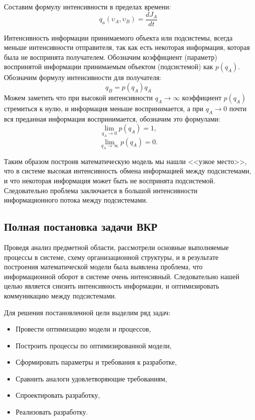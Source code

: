 Составим формулу интенсивности в пределах времени:
\begin{equation}\label{eq:intensiveA}
q_a(\upsilon_A,\upsilon_B) = \frac{dJ_A}{dt}
\end{equation}

Интенсивность информации принимаемого объекта или подсистемы, всегда меньше интенсивности отправителя, так как есть некоторая информация, которая была не воспринята получателем. Обозначим коэффициент (параметр) воспринятой информации принимаемым объектом (подсистемой) как $p(q_A)$. Обозначим формулу интенсивности для получателя:
\begin{equation}\label{eq:intensiveB}
q_B = p(q_A)q_A
\end{equation}
Можем заметить что при высокой интенсивности $q_A \rightarrow \infty$ коэффициент $p(q_A)$ стремиться к нулю, и информация меньше воспринимается, а при $q_A \rightarrow 0$ почти вся преданная информация воспринимается, обозначим это формулами:
\begin{equation}\label{eq:lim1}
\lim_{q_A \rightarrow 0} p(q_A) = 1,
\end{equation}
\begin{equation}\label{eq:lim0}
\lim_{q_A \rightarrow \infty} p(q_A) = 0.
\end{equation}

Таким образом построив математическую модель мы нашли <<узкое место>>, что в системе высокая интенсивность обмена информацией между подсистемами, и что некоторая информация может быть не воспринята подсистемой. Следовательно проблема заключается в большой интенсивности информационного потока между подсистемами.

\subsection{Полная постановка задачи ВКР}
Проведя анализ предметной области, рассмотрели основные выполняемые процессы в системе, схему организационной структуры, и в результате построения математической модели была выявлена проблема, что информационной оборот в системе очень интенсивный. Следовательно нашей целью является снизить интенсивность информации, и оптимизировать коммуникацию между подсистемами.

Для решения постановленной цели выделим ряд задач:
\begin{itemize}
	\item Провести оптимизацию модели и процессов,
	\item Построить процессы по оптимизированной модели,
	\item Сформировать параметры и требования к разработке,
	\item Сравнить аналоги удовлетворяющие требованиям,
	\item Спроектировать разработку,
	\item Реализовать разработку.
\end{itemize}
\pagebreak